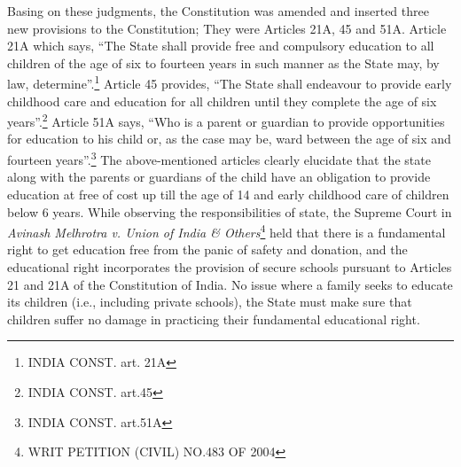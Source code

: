 \begin{multicols}{2}
\noi
Basing on these judgments, the Constitution was amended and inserted three new provisions
to the Constitution; They were Articles 21A, 45 and 51A. Article 21A which says, “The State
shall provide free and compulsory education to all children of the age of six to fourteen years
in such manner as the State may, by law, determine”.\footnote{INDIA CONST. art. 21A} Article 45 provides, “The State shall endeavour to provide early childhood care and education for all children until they complete
the age of six years”.\footnote{INDIA CONST. art.45} Article 51A says, “Who is a parent or guardian to provide
opportunities for education to his child or, as the case may be, ward between the age of six
and fourteen years”.\footnote{INDIA CONST. art.51A} The above-mentioned articles clearly elucidate that the state along with
the parents or guardians of the child have an obligation to provide education at free of cost up
till the age of 14 and early childhood care of children below 6 years. While observing the
responsibilities of state, the Supreme Court in \textit{Avinash Melhrotra v. Union of India \&
Others}\footnote{WRIT PETITION (CIVIL) NO.483 OF 2004} held that there is a fundamental right to get education free from the panic of safety
and donation, and the educational right incorporates the provision of secure schools pursuant
to Articles 21 and 21A of the Constitution of India. No issue where a family seeks to educate
its children (i.e., including private schools), the State must make sure that children suffer no
damage in practicing their fundamental educational right.


\vspace{-.1cm}


\end{multicols}
